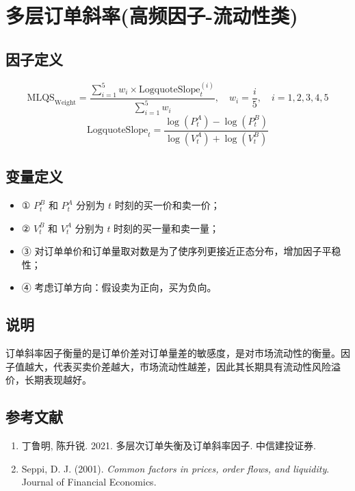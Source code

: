 \documentclass{article}
\begin{document}
\section{多层订单斜率(高频因子-流动性类)}

\subsection{因子定义}
\begin{equation}
    \mathrm{MLQS}_{\mathrm{Weight}} = \frac{\sum_{i=1}^{5} w_i \times \mathrm{LogquoteSlope}_t^{(i)}}{\sum_{i=1}^{5} w_i}, \quad w_i = \frac{i}{5}, \quad i = 1, 2, 3, 4, 5
\end{equation}
\begin{equation}
    \mathrm{LogquoteSlope}_t = \frac{\log\left(P_t^A\right) - \log\left(P_t^B\right)}{\log\left(V_t^A\right) + \log\left(V_t^B\right)}
\end{equation}

\subsection{变量定义}
\begin{itemize}
    \item ① \( P_t^B \) 和 \( P_t^A \) 分别为 \( t \) 时刻的买一价和卖一价；
    \item ② \( V_t^B \) 和 \( V_t^A \) 分别为 \( t \) 时刻的买一量和卖一量；
    \item ③ 对订单单价和订单量取对数是为了使序列更接近正态分布，增加因子平稳性；
    \item ④ 考虑订单方向：假设卖为正向，买为负向。
\end{itemize}

\subsection{说明}
订单斜率因子衡量的是订单价差对订单量差的敏感度，是对市场流动性的衡量。因子值越大，代表买卖价差越大，市场流动性越差，因此其长期具有流动性风险溢价，长期表现越好。

\subsection{参考文献}
\begin{enumerate}
    \item 丁鲁明, 陈升锐. 2021. 多层次订单失衡及订单斜率因子. 中信建投证券.
    \item Seppi, D. J. (2001). \textit{Common factors in prices, order flows, and liquidity}. Journal of Financial Economics.
\end{enumerate}
\end{document}
